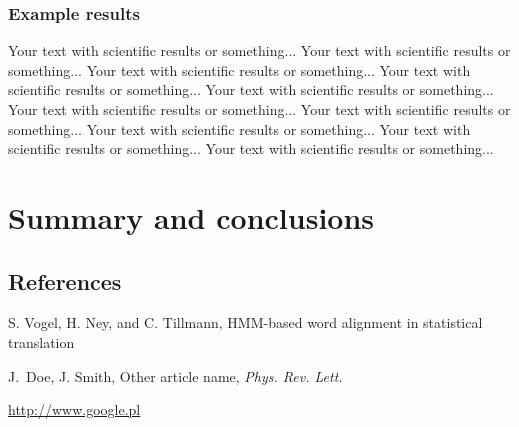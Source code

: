 \documentclass[final]{beamer}
\begin{document}
\begin{frame}[t]
\begin{multicols}{3}
\subsubsection{Example results}
Your text with scientific results or something... 
Your text with scientific results or something... 
Your text with scientific results or something... 
Your text with scientific results or something... 
Your text with scientific results or something... 
Your text with scientific results or something... 
Your text with scientific results or something... 
Your text with scientific results or something... 
Your text with scientific results or something... 
Your text with scientific results or something... 

\section{Summary and conclusions}






\subsection{References}

\begin{thebibliography}{99}

 S. Vogel, H. Ney, and C. Tillmann, HMM-based word alignment in statistical translation

 J.~Doe, J. Smith, Other article name, \textit{Phys. Rev. Lett.}

 \url{http://www.google.pl}

\end{thebibliography}

\end{multicols}

\end{frame}
\end{document}
